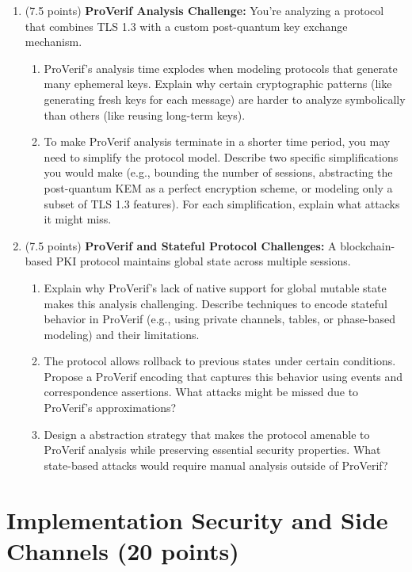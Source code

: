\documentclass[10pt,a4paper,american]{article}
\begin{document}
\begin{enumerate}
	\item (7.5 points) \textbf{ProVerif Analysis Challenge:}
	      You're analyzing a protocol that combines TLS 1.3 with a custom post-quantum key exchange mechanism.
	      \begin{enumerate}
		      \item ProVerif's analysis time explodes when modeling protocols that generate many ephemeral keys. Explain why certain cryptographic patterns (like generating fresh keys for each message) are harder to analyze symbolically than others (like reusing long-term keys).
		      \item To make ProVerif analysis terminate in a shorter time period, you may need to simplify the protocol model. Describe two specific simplifications you would make (e.g., bounding the number of sessions, abstracting the post-quantum KEM as a perfect encryption scheme, or modeling only a subset of TLS 1.3 features). For each simplification, explain what attacks it might miss.
	      \end{enumerate}
	\item (7.5 points) \textbf{ProVerif and Stateful Protocol Challenges:}
	      A blockchain-based PKI protocol maintains global state across multiple sessions.
	      \begin{enumerate}
		      \item Explain why ProVerif's lack of native support for global mutable state makes this analysis challenging. Describe techniques to encode stateful behavior in ProVerif (e.g., using private channels, tables, or phase-based modeling) and their limitations.
		      \item The protocol allows rollback to previous states under certain conditions. Propose a ProVerif encoding that captures this behavior using events and correspondence assertions. What attacks might be missed due to ProVerif's approximations?
		      \item Design a abstraction strategy that makes the protocol amenable to ProVerif analysis while preserving essential security properties. What state-based attacks would require manual analysis outside of ProVerif?
	      \end{enumerate}
\end{enumerate}

\section{Implementation Security and Side Channels (20 points)}
\end{document}
